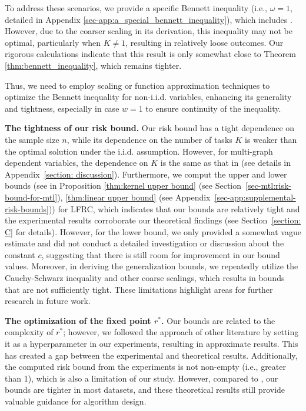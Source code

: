 \documentclass{article}
\begin{document}
To address these scenarios, we provide a specific Bennett inequality (i.e., \( \omega=1 \), detailed in Appendix \ref{sec-app:a_special_bennett_inequality}), which includes \cite{Bartlett_2005}. However, due to the coarser scaling in its derivation, this inequality may not be optimal, particularly when \( K \neq 1 \), resulting in relatively loose outcomes. Our rigorous calculations indicate that this result is only somewhat close to Theorem \ref{thm:bennett_inequality}, which remains tighter.

Thus, we need to employ scaling or function approximation techniques to optimize the Bennett inequality for non-i.i.d. variables, enhancing its generality and tightness, especially in case \( w=1 \) to ensure continuity of the inequality.

\textbf{The tightness of our risk bound.} 
Our risk bound has a tight dependence on the sample size $n$, while its dependence on the number of tasks $K$ is weaker than the optimal solution under the i.i.d. assumption. However, for multi-graph dependent variables, the dependence on $K$ is the same as that in \cite{wu2023macro-auc} (see details in Appendix~\ref{section: discussion}). 
Furthermore, we comput the upper and lower bounds (see in Proposition \ref{thm:kernel upper bound} (see Section~\ref{sec-mtl:risk-bound-for-mtl}), \ref{thm:linear upper bound} (see Appendix~\ref{sec-app:supplemental-risk-bounds})) for LFRC, which indicates that our bounds are relatively tight and the experimental results corroborate our theoretical findings (see 
 Section~\ref{section: C} for details). However, for the lower bound, we only provided a somewhat vague estimate and did not conduct a detailed investigation or discussion about the constant \( c \), suggesting that there is still room for improvement in our bound values. Moreover, in deriving the generalization bounds, we repeatedly utilize the Cauchy-Schwarz inequality and other coarse scalings, which results in bounds that are not sufficiently tight. These limitations highlight areas for further research in future work.


\textbf{The optimization of the fixed point \( r^* \).}
Our bounds are related to the complexity of $r^*$; however, we followed the approach of other literature by setting it as a hyperparameter in our experiments, resulting in approximate results. This has created a gap between the experimental and theoretical results. Additionally, the computed risk bound from the experiments is not non-empty (i.e., greater than 1), which is also a limitation of our study. However, compared to \cite{wu2023macro-auc}, our bounds are tighter in most datasets, and these theoretical results still provide valuable guidance for algorithm design.
\end{document}
